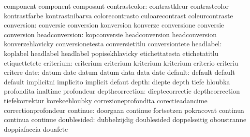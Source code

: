                            component                 component
                           composant
            contrastcolor: contrastkleur             contrastcolor
                           kontrastfarbe             kontrastnibarva
                           colorecontrasto           culoarecontrast
                           coleurcontraste
               conversion: conversie                 conversion
                           konversion                konverze
                           conversione               conversie
                           conversion
           headconversion: kopconversie              headconversion
                           headconversion            konverzehlavicky
                           conversionetesta          conversietitlu
                           conversiontete %
                headlabel: koplabel                  headlabel
                           headlabel                 popisekhlavicky
                           etichettatesta            etichetatitlu
                           etiquettetete
                criterium: criterium                 criterium
                           kriterium                 kriterium
                           criterio                  criteriu
                           critere
                     date: datum                     date
                           datum                     datum
                           data                      data
                           date
                  default: default                   default
                           default                   implicitni
                           implicito                 implicit
                           defaut
                    depth: diepte                    depth
                           tiefe                     hloubka
                           profondita                inaltime
                           profondeur
          depthcorrection: dieptecorrectie           depthcorrection
                           tiefekorrektur            korekcehloubky
                           correzioneprofondita      corectieadancime
                           correctionprofondeur
                 continue: doorgaan                  continue
                           fortsetzen                pokracovat
                           continua                  continua
                           continue
              doublesided: dubbelzijdig              doublesided
                           doppelseitig              oboustranne
                           doppiafaccia              douafete

